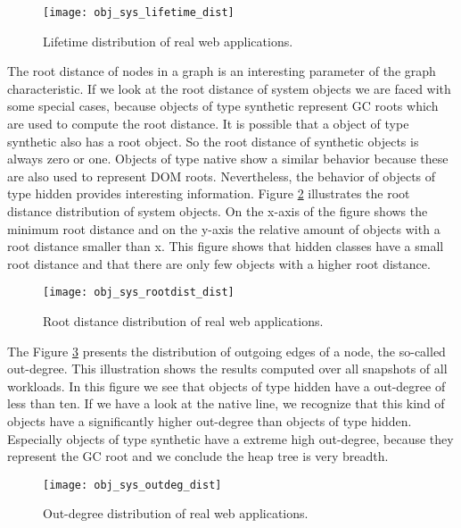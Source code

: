 \begin{figure}
	\centering
	\texttt{[image: obj\_sys\_lifetime\_dist]}
	\caption{Lifetime distribution of real web applications.}
	\label{fig:obj_sys_lieftiem_dist}
\end{figure}

The root distance of nodes in a graph is an interesting parameter of the graph characteristic. If we look at the root distance of system objects we are faced with some special cases, because objects of type synthetic represent GC roots which are used to compute the root distance. It is possible that a object of type synthetic also has a root object. So the root distance of synthetic objects is always zero or one. Objects of type native show a similar behavior because these are also used to represent DOM roots. Nevertheless, the behavior of objects of type hidden provides interesting information. Figure \ref{fig:obj_sys_rootdist_dist} illustrates the root distance distribution of system objects. On the x-axis of the figure shows the minimum root distance and on the y-axis the relative amount of objects with a root distance smaller than x. This figure shows that hidden classes have a small root distance and that there are only few objects with a higher root distance.

\begin{figure}
	\centering
	\texttt{[image: obj\_sys\_rootdist\_dist]}
	\caption{Root distance distribution of real web applications.}
	\label{fig:obj_sys_rootdist_dist}
\end{figure}

The Figure \ref{fig:obj_sys_outdeg_dist} presents the distribution of outgoing
edges of a node, the so-called out-degree. This illustration shows the results
computed over all snapshots of all workloads. In this figure we see that
objects of type hidden have a out-degree of less than ten. If we have a look at
the native line, we recognize that this kind of objects have a significantly
higher out-degree than objects of type hidden. Especially objects of type
synthetic have a extreme high out-degree, because they represent the GC root
and we conclude the heap tree is very breadth.

\begin{figure}
	\centering
	\texttt{[image: obj\_sys\_outdeg\_dist]}
	\caption{Out-degree distribution of real web applications.}
	\label{fig:obj_sys_outdeg_dist}
\end{figure}

% 
